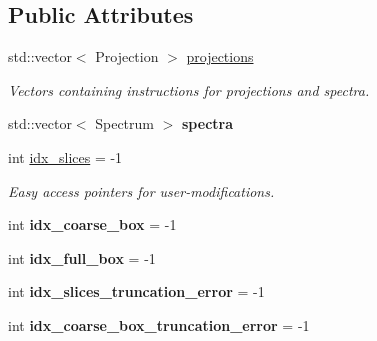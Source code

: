 \subsection*{Public Attributes}
\begin{DoxyCompactItemize}
\item 
\mbox{\label{classsledgehamr_1_1IOModule_acf047b35679a313d50a8ca42be6c8956}} 
std\+::vector$<$ Projection $>$ \mbox{\hyperlink{classsledgehamr_1_1IOModule_acf047b35679a313d50a8ca42be6c8956}{projections}}
\begin{DoxyCompactList}\small\item\em Vectors containing instructions for projections and spectra. \end{DoxyCompactList}\item 
\mbox{\label{classsledgehamr_1_1IOModule_a0d5e66413be2b95f3873eaa3fd55f8b9}} 
std\+::vector$<$ Spectrum $>$ {\bfseries spectra}
\item 
\mbox{\label{classsledgehamr_1_1IOModule_aa6af01cdd296efb0893eca1ef85bfbd0}} 
int \mbox{\hyperlink{classsledgehamr_1_1IOModule_aa6af01cdd296efb0893eca1ef85bfbd0}{idx\+\_\+slices}} = -\/1
\begin{DoxyCompactList}\small\item\em Easy access pointers for user-\/modifications. \end{DoxyCompactList}\item 
\mbox{\label{classsledgehamr_1_1IOModule_a99784bd378acf2b2efabb7beb4315dbb}} 
int {\bfseries idx\+\_\+coarse\+\_\+box} = -\/1
\item 
\mbox{\label{classsledgehamr_1_1IOModule_a6551a072168dbcdd788f892e27530173}} 
int {\bfseries idx\+\_\+full\+\_\+box} = -\/1
\item 
\mbox{\label{classsledgehamr_1_1IOModule_a3c61a64fa45ddd8eced004a242db0e85}} 
int {\bfseries idx\+\_\+slices\+\_\+truncation\+\_\+error} = -\/1
\item 
\mbox{\label{classsledgehamr_1_1IOModule_aace81c8a6d11eed4316b8021820dc39f}} 
int {\bfseries idx\+\_\+coarse\+\_\+box\+\_\+truncation\+\_\+error} = -\/1

\end{DoxyCompactItemize}
